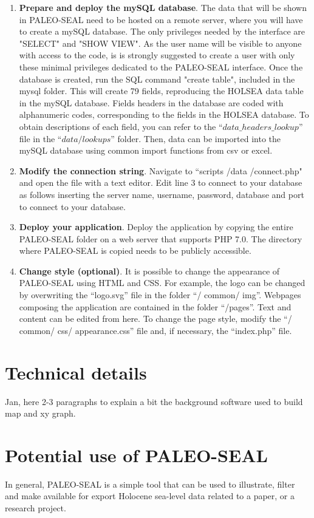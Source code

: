 \documentclass[a4paper,fleqn]{cas-dc}
\begin{document}
\begin{enumerate}
\item \textbf{Prepare and deploy the mySQL database}. The data that will be shown in PALEO-SEAL need to be hosted on a remote server, where you will have to create a mySQL database. The only privileges needed by the interface are "SELECT" and "SHOW VIEW". As the user name will be visible to anyone with access to the code, is is strongly suggested to create a user with only these minimal privileges dedicated to the PALEO-SEAL interface. Once the database is created, run the SQL command "create table", included in the mysql folder. This will create 79 fields, reproducing the HOLSEA data table in the mySQL database. Fields headers in the database are coded with alphanumeric codes, corresponding to the fields in the HOLSEA database. To obtain descriptions of each field, you can refer to the ``$data\_headers\_lookup$'' file in the ``$data/lookups$'' folder. Then, data can be imported into the mySQL database using common import functions from csv or excel.

\item \textbf{Modify the connection string}. Navigate to ``scripts /data /connect.php" and open the file with a text editor. Edit line 3 to connect to your database as follows inserting the server name, username, password, database and port to connect to your database.

\item \textbf{Deploy your application}. Deploy the application by copying the entire PALEO-SEAL folder on a web server that supports PHP 7.0. The directory where PALEO-SEAL is copied needs to be publicly accessible.

\item \textbf{Change style (optional)}. It is possible to change the appearance of PALEO-SEAL using HTML and CSS. For example, the logo can be changed by overwriting the ``logo.svg'' file in the folder ``/ common/ img''. Webpages composing the application are contained in the folder ``/pages''. Text and content can be edited from here. To change the page style, modify the ``/ common/ css/ appearance.css'' file and, if necessary, the ``index.php'' file.
\end{enumerate}

\section{Technical details}
Jan, here 2-3 paragraphs to explain a bit the background software used to build map and xy graph.

\section{Potential use of PALEO-SEAL}
In general, PALEO-SEAL is a simple tool that can be used to illustrate, filter and make available for export Holocene sea-level data related to a paper, or a research project.   

\printcredits

%



\end{document}
